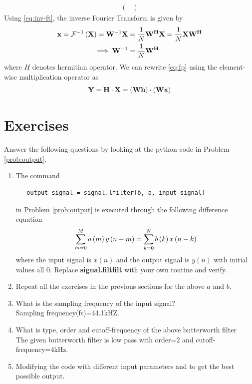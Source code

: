 \documentclass[journal,12pt,twocolumn]{IEEEtran}
\renewcommand\thesection{\arabic{section}}
\begin{document}
\begin{enumerate}[label=\thesection.\arabic*]
\begin{align}
\begin{pmatrix}
   \end{pmatrix}
 \end{align}
 \noindent Using \eqref{eq:inv-ft}, the inverse Fourier Transform is given by
 \begin{align}
   \mathbf{x} = \mathcal{F}^{-1}\left(\mathbf{X}\right) = \mathbf{W}^{-1}\mathbf{X} &= \frac{1}{N}\mathbf{W^{H}}\mathbf{X} = \frac{1}{N}\mathbf{X}\mathbf{W^{H}} \\ 
   \implies \mathbf{W}^{-1} &= \frac{1}{N}\mathbf{W^{H}}
 \end{align}
 \noindent where $H$ denotes hermitian operator. We can rewrite \eqref{eq:fp} using the element-wise multiplication operator as
 \begin{align}
   \mathbf{Y} = \mathbf{H}\cdot\mathbf{X} = \left(\mathbf{W}\mathbf{h}\right)\cdot\left(\mathbf{W}\mathbf{x}\right)
 \end{align}
 \end{enumerate}
 \section{Exercises}
 Answer the following questions by looking at the python code in Problem \ref{prob:output}.
 \begin{enumerate}[label=\thesection.\arabic*]
 \item
 The command
 \begin{lstlisting}
   output_signal = signal.lfilter(b, a, input_signal)
   \end{lstlisting}
 in Problem \ref{prob:output} is executed through the following difference equation
 \begin{equation}
 \label{eq:iir_filter_gen}
  \sum _{m=0}^{M}a\left(m\right)y\left(n-m\right)=\sum _{k=0}^{N}b\left(k\right)x\left(n-k\right)
 \end{equation}
 where the input signal is $x(n)$ and the output signal is $y(n)$ with initial values all 0. Replace
 \textbf{signal.filtfilt} with your own routine and verify.
 \item Repeat all the exercises in the previous sections for the above $a$ and $b$.
 \item What is the sampling frequency of the input signal?
 \\
 \solution 
 Sampling frequency(fs)=44.1kHZ.
 \item
 What is type, order and  cutoff-frequency of the above butterworth filter
 \\
 \solution
 The given butterworth filter is low pass with order=2 and cutoff-frequency=4kHz.
 \item
 Modifying the code with different input parameters and to get the best possible output.
 \end{enumerate}
 
\end{document}
